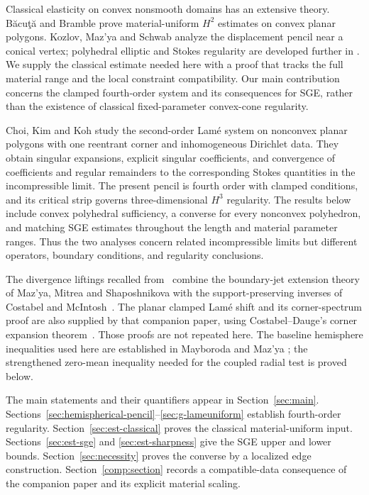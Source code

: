 \documentclass[11pt,a4paper]{article}
\theoremstyle{remark}
\numberwithin{equation}{section}
\begin{document}
Classical elasticity on convex nonsmooth domains has an extensive
theory. B\u{a}cu\c{t}\u{a} and Bramble \cite{BacutaBramble2003} prove
material-uniform \(H^2\) estimates on convex planar polygons.
Kozlov, Maz'ya and Schwab \cite{KozlovMazyaSchwab1992} analyze the
displacement pencil near a conical vertex; polyhedral elliptic and Stokes
regularity are developed further in \cite{MazyaRossmann2004,MazyaRossmann2007}.
We supply the classical estimate needed here with a proof that tracks
the full material range and the local constraint compatibility.
Our main contribution concerns the clamped fourth-order system and its
consequences for SGE, rather than the existence of classical fixed-parameter
convex-cone regularity.

Choi, Kim and Koh \cite{ChoiKimKoh2025} study the second-order Lam\'e
system on nonconvex planar polygons with one reentrant corner and
inhomogeneous Dirichlet data.
They obtain singular expansions, explicit singular coefficients, and
convergence of coefficients and regular remainders to the corresponding
Stokes quantities in the incompressible limit. The present pencil is
fourth order with clamped conditions, and its critical strip governs
three-dimensional \(H^3\) regularity. The results below include convex
polyhedral sufficiency, a converse for every nonconvex polyhedron,
and matching SGE estimates throughout the length and material parameter
ranges. Thus the two analyses concern related incompressible limits
but different operators, boundary conditions, and regularity conclusions.

The divergence liftings recalled from~\cite{PolygonCompanion2026} combine
the boundary-jet extension theory of Maz'ya, Mitrea and Shaposhnikova
\cite{MazyaMitreaShaposhnikova2010} with the support-preserving inverses of Costabel and
McIntosh~\cite{CostabelMcIntosh2010}. The planar clamped Lam\'e shift and
its corner-spectrum proof are also supplied by that companion paper,
using Costabel--Dauge's corner expansion theorem~\cite{CostabelDauge1994}.
Those proofs are not repeated here.
The baseline hemisphere inequalities used here are established in
Mayboroda and Maz'ya \cite[Lemma~2.3, (2.16), (2.25)]{MayborodaMazya2008};
the strengthened zero-mean inequality needed for the coupled radial
test is proved below.

The main statements and their quantifiers appear in Section~\ref{sec:main}.
Sections~\ref{sec:hemispherical-pencil}--\ref{sec:g-lameuniform}
establish fourth-order regularity. Section~\ref{sec:est-classical}
proves the classical material-uniform input.
Sections~\ref{sec:est-sge} and \ref{sec:est-sharpness}
give the SGE upper and lower bounds.
Section~\ref{sec:necessity} proves the converse by a localized edge
construction. Section~\ref{comp:section} records a compatible-data
consequence of the companion paper and its explicit material scaling.
\end{document}
